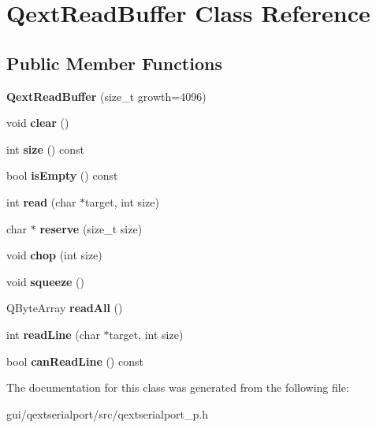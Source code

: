 \hypertarget{classQextReadBuffer}{}\section{Qext\+Read\+Buffer Class Reference}
\label{classQextReadBuffer}
\subsection*{Public Member Functions}
\begin{DoxyCompactItemize}
\item 
\mbox{\label{classQextReadBuffer_a7ae54f95b884a2ac522c7f27a9e1eb5d}} 
{\bfseries Qext\+Read\+Buffer} (size\+\_\+t growth=4096)
\item 
\mbox{\label{classQextReadBuffer_ab903dcbd4394f4140f89ccff5ddae172}} 
void {\bfseries clear} ()
\item 
\mbox{\label{classQextReadBuffer_ac108f29f34a0d7b5e6295bc9243d7de4}} 
int {\bfseries size} () const
\item 
\mbox{\label{classQextReadBuffer_adbb74a25f667ee77e0cc2174c74dfc11}} 
bool {\bfseries is\+Empty} () const
\item 
\mbox{\label{classQextReadBuffer_ae8a5c16f2ef2e720ec92f4f228fed5a6}} 
int {\bfseries read} (char $\ast$target, int size)
\item 
\mbox{\label{classQextReadBuffer_a999f128b49feab8ab71a9d11ef6f4b7a}} 
char $\ast$ {\bfseries reserve} (size\+\_\+t size)
\item 
\mbox{\label{classQextReadBuffer_af17e28158a3206f118bf9216ffaa271e}} 
void {\bfseries chop} (int size)
\item 
\mbox{\label{classQextReadBuffer_a867109c137afe6392850a68867cd8a9e}} 
void {\bfseries squeeze} ()
\item 
\mbox{\label{classQextReadBuffer_a58a35508796ccc53d709fc95992e4488}} 
Q\+Byte\+Array {\bfseries read\+All} ()
\item 
\mbox{\label{classQextReadBuffer_a7fa9d2a8f3e014d10ca7400be5a18cd1}} 
int {\bfseries read\+Line} (char $\ast$target, int size)
\item 
\mbox{\label{classQextReadBuffer_ad764f421710b35e9ec8b62f43bf2fe79}} 
bool {\bfseries can\+Read\+Line} () const
\end{DoxyCompactItemize}


The documentation for this class was generated from the following file\+:\begin{DoxyCompactItemize}
\item 
gui/qextserialport/src/qextserialport\+\_\+p.\+h\end{DoxyCompactItemize}
